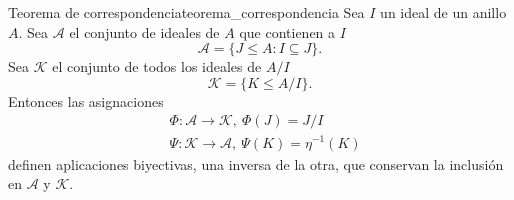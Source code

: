 \begin{theorem}{Teorema de correspondencia}{teorema_correspondencia}
    Sea \(I\) un ideal de un anillo \(A\). Sea $\mathcal{A}$ el conjunto de ideales de \(A\) que contienen a \(I\)
    \[
    \mathcal{A} = \{J \leq A : I \subseteq J\}.
    \]
    Sea $\mathcal{K}$ el conjunto de todos los ideales de \(A/I\)
    \[
    \mathcal{K} = \{ K \leq A/I \}.
    \]
    Entonces las asignaciones
    \begin{align*}
    &\Phi : \mathcal{A} \to \mathcal{K},\ \Phi(J) = J/I \\
    &\Psi : \mathcal{K} \to \mathcal{A},\ \Psi(K) = \eta^{-1}(K)
    \end{align*}
    definen aplicaciones biyectivas, una inversa de la otra, que conservan la inclusión en $\mathcal{A}$ y $\mathcal{K}$.
\end{theorem}

